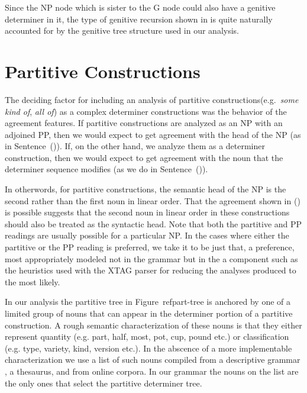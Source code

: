 Since the NP node which is sister
to the G node could also have a genitive determiner in it, the type of
genitive recursion shown in  is quite naturally accounted for
by the genitive tree structure used in our analysis.

\section{Partitive Constructions}

The deciding factor for including an analysis of partitive constructions(e.g.\ {\it some kind
of}, {\it all of\/}) as a complex determiner constructions was the
behavior of the agreement features.  If partitive constructions are analyzed as
an NP with an adjoined PP, then we would expect to get agreement with the head
of the NP (as in Sentence~({})).  If, on the other hand, we analyze them
as a determiner construction, then we would expect to get agreement with the
noun that the determiner sequence modifies (as we do in Sentence~({})).


In otherwords, for partitive constructions, the semantic head of the NP is the second rather than the first noun in linear order. That the agreement shown in ({}) is possible suggests that the second noun in linear order in these constructions should also be treated as the syntactic head. Note that both the partitive and PP readings are usually possible for a particular NP. In the cases where either the partitive or the PP reading is preferred, we take it to be just that, a preference, most appropriately modeled not in the grammar but in the a component such as the heuristics used with the XTAG parser for reducing the analyses produced to the most likely. 

In our analysis the partitive tree in Figure~ref{part-tree} is anchored
by one of a limited group of nouns that can appear in the determiner
portion of a partitive construction. A rough semantic characterization
of these nouns is that they either represent quantity (e.g. part, half,
most, pot, cup, pound etc.) or classification (e.g. type, variety,
kind, version etc.).  In the abscence of a more implementable
characterization we use a list of such nouns compiled from a
descriptive grammar \cite{quirk85}, a thesaurus, and from online
corpora. In our grammar the nouns on the list are the only ones that
select the partitive determiner tree. 


